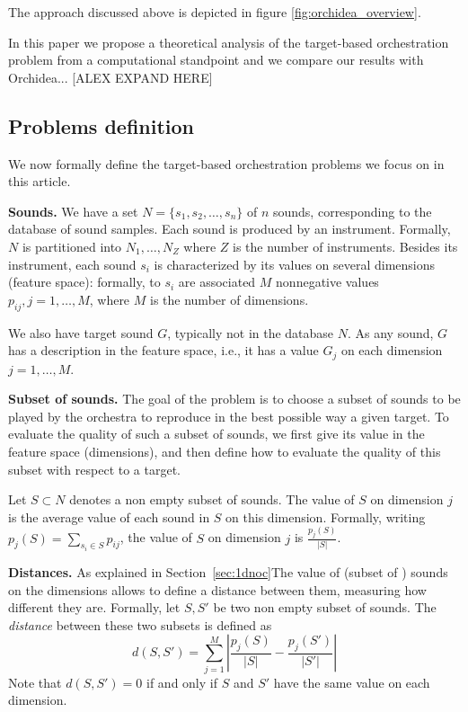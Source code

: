 \documentclass[a4paper]{book}
\begin{document}
The approach discussed above is depicted in figure \ref{fig:orchidea_overview}.

In this paper we propose a theoretical analysis of the target-based orchestration problem from a computational standpoint and we compare our results with Orchidea... [ALEX EXPAND HERE]

\subsection{Problems definition}\label{sec:def}


We now formally define the target-based orchestration problems we focus on in this article. 

{\bf Sounds.} We have a set $N=\{s_1,s_2,\dots,s_n\}$ of $n$ sounds, corresponding to the database of sound samples. Each sound is produced by  an instrument. Formally, $N$ is partitioned into $N_1,\dots,N_Z$ where $Z$ is the number of instruments. Besides its instrument, each sound $s_i$ is characterized by its values on several dimensions (feature space): formally, to $s_i$ are associated $M$ nonnegative values $p_{ij},j=1,\dots,M$, where $M$ is the number of dimensions.

We also have  target sound $G$, typically not in the database $N$. As any sound, $G$ has a description in the feature space, i.e., it has a value $G_j$ on each dimension $j=1,\dots,M$.

{\bf Subset of sounds.} The goal of the problem is to choose a subset of sounds to be played by the orchestra to reproduce in the best possible way a given target. To evaluate the quality of such a subset of sounds, we first give its value in the feature space (dimensions), and then define how to evaluate the quality of this subset with respect to a target. 

Let $S\subset N$ denotes a non empty subset of sounds. The value of $S$ on dimension $j$ is the average value of each sound in $S$ on this dimension. Formally, writing $p_j(S)=\sum_{s_i\in S}p_{ij}$, the value of $S$ on dimension $j$ is $\frac{p_j(S)}{|S|}$. 

{\bf Distances.} As explained in Section~\ref{sec:1dnoc}The value of (subset of ) sounds on the dimensions allows to define a distance between them, measuring how different they are. Formally, let $S,S'$ be two non empty subset of sounds. The {\it distance} between these two subsets is defined as $$d(S,S')=\sum_{j=1}^M \left| \frac{p_j(S)}{|S|} - \frac{p_j(S')}{|S'|}\right|$$
Note that $d(S,S')=0$ if and only if $S$ and $S'$ have the same value on each dimension.
\end{document}
